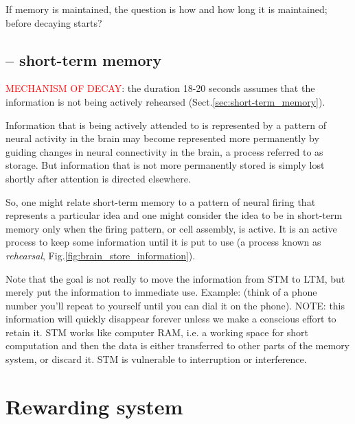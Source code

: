

If memory is maintained, the question is how and how long it is maintained;
before decaying starts?

\subsection{-- short-term memory}
\label{sec:memory-decay-short-term-memory}

\textcolor{red}{MECHANISM OF DECAY}: the duration 18-20 seconds assumes that the
information is not being actively rehearsed (Sect.\ref{sec:short-term_memory}).

Information that is being actively attended to is represented by a pattern of
neural activity in the brain may become represented more permanently by guiding
changes in neural connectivity in the brain, a process referred to as storage.
But information that is not more permanently stored is simply lost shortly after
attention is directed elsewhere.
  
So, one might relate short-term memory to a pattern of neural firing that
represents a particular idea and one might consider the idea to be in short-term memory
only when the firing pattern, or cell assembly, is active.
It is an active process to keep some information until it is put to use (a
process known as {\it rehearsal}, Fig.\ref{fig:brain_store_information}).

Note that the goal is not really to move the information from STM to LTM, but
merely put  the information to immediate use. Example:  (think of a phone number
 you'll repeat to yourself until you can dial it on the phone).
NOTE: this information will quickly disappear forever unless we make a conscious
effort to retain it.
STM works like computer RAM, i.e. a working space for short computation and then
the data is either transferred to other parts of the memory system, or discard
it. STM is vulnerable to interruption or interference.

\section{Rewarding system}
\label{sec:reward-system}

